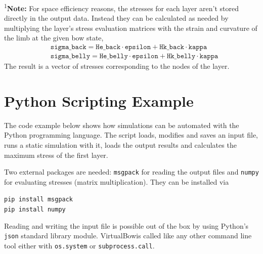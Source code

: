 \documentclass[12pt]{article}
\newcommand{\swtitle}{VirtualBow}
\begin{document}
\textsuperscript{1}\textbf{Note:} For space efficiency reasons, the stresses for each layer aren't stored directly in the output data. Instead they can be calculated as needed by multiplying the layer's stress evaluation matrices with the strain and curvature of the limb at the given bow state,
%
\begin{align*}
&\mathrm{\texttt{sigma\_back}} = \mathrm{\texttt{He\_back}} \cdot \mathrm{\texttt{epsilon}} + \mathrm{\texttt{Hk\_back}} \cdot \mathrm{\texttt{kappa}}\\
&\mathrm{\texttt{sigma\_belly}} = \mathrm{\texttt{He\_belly}} \cdot \mathrm{\texttt{epsilon}} + \mathrm{\texttt{Hk\_belly}} \cdot \mathrm{\texttt{kappa}}
\end{align*}
%
The result is a vector of stresses corresponding to the nodes of the layer.


\newpage
\section{Python Scripting Example}
\label{sec:scripting-examples}

The code example below shows how simulations can be automated with the Python programming language. The script loads, modifies and saves an input file, runs a static simulation with it, loads the output results and calculates the maximum stress of the first layer.

Two external packages are needed: \texttt{msgpack} for reading the output files and \texttt{numpy} for evaluating stresses (matrix multiplication). They can be installed via

\smallskip

\begin{framed}
\texttt{pip install msgpack}\\
\texttt{pip install numpy}
\end{framed}

Reading and writing the input file is possible out of the box by using Python's \texttt{json} standard library module. \swtitle is called like any other command line tool either with \texttt{os.system} or \texttt{subprocess.call}.

\end{document}
